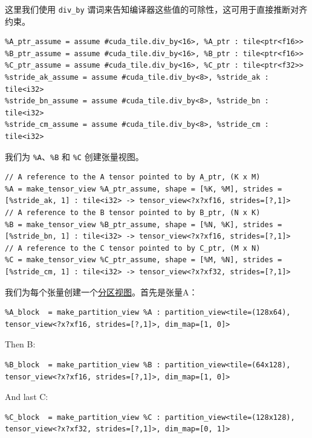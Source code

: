 \documentclass{article}
\begin{document}
这里我们使用 \texttt{div\_by} 谓词来告知编译器这些值的可除性，这可用于直接推断对齐约束。


\begin{lstlisting}
%A_ptr_assume = assume #cuda_tile.div_by<16>, %A_ptr : tile<ptr<f16>>
%B_ptr_assume = assume #cuda_tile.div_by<16>, %B_ptr : tile<ptr<f16>>
%C_ptr_assume = assume #cuda_tile.div_by<16>, %C_ptr : tile<ptr<f32>>
%stride_ak_assume = assume #cuda_tile.div_by<8>, %stride_ak : tile<i32>
%stride_bn_assume = assume #cuda_tile.div_by<8>, %stride_bn : tile<i32>
%stride_cm_assume = assume #cuda_tile.div_by<8>, %stride_cm : tile<i32>
\end{lstlisting}

我们为 \texttt{\%A}、\texttt{\%B} 和 \texttt{\%C} 创建张量视图。


\begin{lstlisting}
// A reference to the A tensor pointed to by A_ptr, (K x M)
%A = make_tensor_view %A_ptr_assume, shape = [%K, %M], strides = [%stride_ak, 1] : tile<i32> -> tensor_view<?x?xf16, strides=[?,1]>
// A reference to the B tensor pointed to by B_ptr, (N x K)
%B = make_tensor_view %B_ptr_assume, shape = [%N, %K], strides = [%stride_bn, 1] : tile<i32> -> tensor_view<?x?xf16, strides=[?,1]>
// A reference to the C tensor pointed to by C_ptr, (M x N)
%C = make_tensor_view %C_ptr_assume, shape = [%M, %N], strides = [%stride_cm, 1] : tile<i32> -> tensor_view<?x?xf32, strides=[?,1]>
\end{lstlisting}

我们为每个张量创建一个\href{https://docs.nvidia.com/cuda/tile-ir/latest/sections/types.html#type-partition-view}{分区视图}。首先是张量A：


\begin{lstlisting}
%A_block  = make_partition_view %A : partition_view<tile=(128x64), tensor_view<?x?xf16, strides=[?,1]>, dim_map=[1, 0]>
\end{lstlisting}

Then B:


\begin{lstlisting}
%B_block  = make_partition_view %B : partition_view<tile=(64x128), tensor_view<?x?xf16, strides=[?,1]>, dim_map=[1, 0]>
\end{lstlisting}

And last C:


\begin{lstlisting}
%C_block  = make_partition_view %C : partition_view<tile=(128x128), tensor_view<?x?xf32, strides=[?,1]>, dim_map=[0, 1]>
\end{lstlisting}
\end{document}

